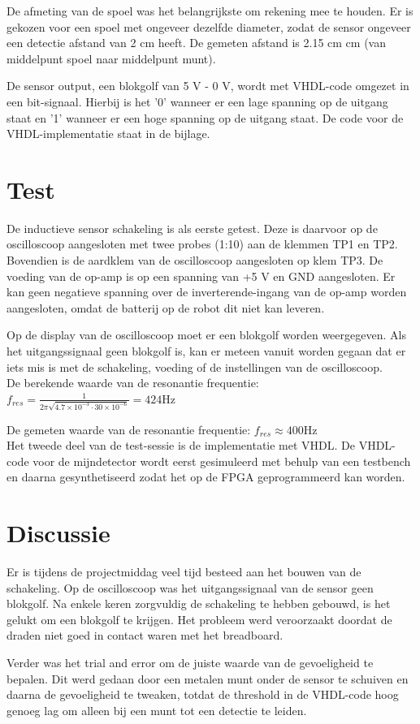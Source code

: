\documentclass{report}
\begin{document}
De afmeting van de spoel was het belangrijkste om rekening mee te houden. Er is gekozen voor een spoel met ongeveer dezelfde diameter, zodat de sensor ongeveer een detectie afstand van 2 cm heeft. De gemeten afstand is 2.15 cm  cm (van middelpunt spoel naar middelpunt munt).

De sensor output, een blokgolf van 5 V - 0 V, wordt met VHDL-code omgezet in een bit-signaal. Hierbij is het '0' wanneer er een lage spanning op de uitgang staat en '1' wanneer er een hoge spanning op de uitgang staat. De code voor de VHDL-implementatie staat in de bijlage.

\section{Test}
De inductieve sensor schakeling is als eerste getest. Deze is daarvoor op de oscilloscoop aangesloten met twee probes (1:10) aan de klemmen TP1 en TP2. Bovendien is de aardklem van de oscilloscoop aangesloten op klem TP3. De voeding van de op-amp is op een spanning van +5 V en GND aangesloten. Er kan geen negatieve spanning over de inverterende-ingang van de op-amp worden aangesloten, omdat de batterij op de robot dit niet kan leveren. 

Op de display van de oscilloscoop moet er een blokgolf worden weergegeven. Als het uitgangssignaal geen blokgolf is, kan er meteen vanuit worden gegaan dat er iets mis is met de schakeling, voeding of de instellingen van de oscilloscoop.\\
De berekende waarde van de resonantie frequentie:
$f_{res}=\frac{1}{2\pi \sqrt{4.7\times 10^{-3}\cdot 30\times 10^{-6}}}= 424 \mathrm{Hz}$

\noindent De gemeten waarde van de resonantie frequentie:
$f_{res}\approx400 \mathrm{Hz}$\\

\noindent Het tweede deel van de test-sessie is de implementatie met VHDL. De VHDL-code voor de mijndetector wordt eerst gesimuleerd met behulp van een testbench en daarna gesynthetiseerd zodat het op de FPGA geprogrammeerd kan worden. 

\section{Discussie}
Er is tijdens de projectmiddag veel tijd besteed aan het bouwen van de schakeling. Op de oscilloscoop was het uitgangssignaal van de sensor geen blokgolf. Na enkele keren zorgvuldig de schakeling te hebben gebouwd, is het gelukt om een blokgolf te krijgen. Het probleem werd veroorzaakt doordat de draden niet goed in contact waren met het breadboard.

Verder was het trial and error om de juiste waarde van de gevoeligheid te bepalen. Dit werd gedaan door een metalen munt onder de sensor te schuiven en daarna de gevoeligheid te tweaken, totdat de threshold in de VHDL-code hoog genoeg lag om alleen bij een munt tot een detectie te leiden.
\end{document}
